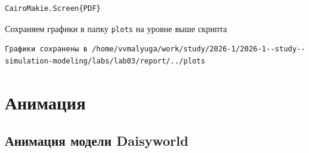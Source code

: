\documentclass[
  english,
  russian,
  12pt,
  a4paper,
  DIV=11,
  numbers=noendperiod]{scrreprt}
\newenvironment{Shaded}{\begin{snugshade}}{\end{snugshade}}
\newcommand{\FunctionTok}[1]{\textcolor[rgb]{0.13,0.29,0.53}{\textbf{#1}}}
\newcommand{\NormalTok}[1]{#1}
\newcommand{\OperatorTok}[1]{\textcolor[rgb]{0.81,0.36,0.00}{\textbf{#1}}}
\newcommand{\PreprocessorTok}[1]{\textcolor[rgb]{0.56,0.35,0.01}{\textit{#1}}}
\newcommand{\SpecialCharTok}[1]{\textcolor[rgb]{0.81,0.36,0.00}{\textbf{#1}}}
\newcommand{\StringTok}[1]{\textcolor[rgb]{0.31,0.60,0.02}{#1}}
\begin{document}
\begin{verbatim}
CairoMakie.Screen{PDF}
\end{verbatim}

Сохраняем графики в папку \texttt{plots} на уровне выше скрипта

\begin{Shaded}
\end{Shaded}

\begin{verbatim}
Графики сохранены в /home/vvmalyuga/work/study/2026-1/2026-1--study--simulation-modeling/labs/lab03/report/../plots
\end{verbatim}

\section{Анимация}\label{ux430ux43dux438ux43cux430ux446ux438ux44f-1}

\subsection{Анимация модели
Daisyworld}\label{ux430ux43dux438ux43cux430ux446ux438ux44f-ux43cux43eux434ux435ux43bux438-daisyworld}
\end{document}
